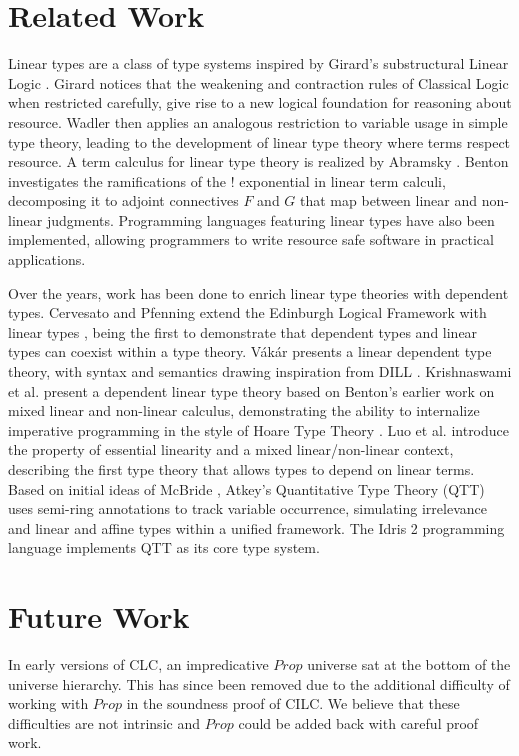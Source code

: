 \documentclass[sigplan,screen,review,anonymous]{acmart}
\begin{document}
\section{Related Work}
Linear types are a class of type systems inspired by Girard's substructural Linear Logic \cite{girard}. Girard notices that the weakening and contraction rules of Classical Logic when restricted carefully, give rise to a new logical foundation for reasoning about resource. Wadler \cite{wadler1990,wadler1991} then applies an analogous restriction to variable usage in simple type theory, leading to the development of linear type theory where terms respect resource. A term calculus for linear type theory is realized by Abramsky \cite{abramsky1993}. Benton \cite{benton1994} investigates the ramifications of the ! exponential in linear term calculi, decomposing it to adjoint connectives $F$ and $G$ that map between linear and non-linear judgments. Programming languages \cite{l3,ats,linear-haskell} featuring linear types have also been implemented, allowing programmers to write resource safe software in practical applications.

Over the years, work has been done to enrich linear type theories with dependent types. Cervesato and Pfenning extend the Edinburgh Logical Framework with linear types \cite{lf,llf}, being the first to demonstrate that dependent types and linear types can coexist within a type theory. V\'{a}k\'{a}r \cite{vakar14} presents a linear dependent type theory, with syntax and semantics drawing inspiration from DILL \cite{dill}.  Krishnaswami et al. present a dependent linear type theory \cite{neel15} based on Benton's earlier work on mixed linear and non-linear calculus, demonstrating the ability to internalize imperative programming in the style of Hoare Type Theory \cite{htt}. Luo et al. \cite{luo} introduce the property of essential linearity and a mixed linear/non-linear context, describing the first type theory that allows types to depend on linear terms. Based on initial ideas of McBride \cite{nothing}, Atkey's Quantitative Type Theory (QTT) \cite{qtt} uses semi-ring annotations to track variable occurrence, simulating irrelevance and linear and affine types within a unified framework. The Idris 2 programming language \cite{idris2} implements QTT as its core type system.

\section{Future Work}
In early versions of CLC, an impredicative $Prop$ universe sat at the bottom of the universe hierarchy. This has since been removed due to the additional difficulty of working with $Prop$ in the soundness proof of CILC. We believe that these difficulties are not intrinsic and $Prop$ could be added back with careful proof work.
\end{document}
